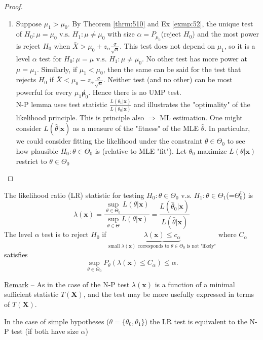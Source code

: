 \documentclass[english, 11pt]{article}
\begin{document}
\begin{proof}
\begin{enumerate}
\item Suppose $\mu_1>\mu_0$. By Theorem \ref{thrm:510} and Ex \ref{exmp:52}, the unique test of $H_0:\mu=\mu_0\text{ v.s. }H_1:\mu\not=\mu_0$ with size $\alpha=P_{\mu_0}$(reject $H_0$) and the most power is reject $H_0$ when $\bar{X}>\mu_0+z_\alpha\frac{\sigma}{\sqrt{n}}$. This test does not depend on $\mu_1$, so it is a level $\alpha$ test for $H_0:\mu=\mu\text{ v.s. }H_1:\mu\not=\mu_0$. No other test has more power at $\mu=\mu_1$. Similarly, if $\mu_1<\mu_0$, then the same can be said for the test that rejects $H_0$ if $\bar{X}<\mu_0-z_\alpha\frac{\sigma}{\sqrt{n}}$. Neither test (and no other) can be most powerful for every $\mu_1\not\mu_0$. Hence there is no UMP test.\\
N-P lemma uses test statistic $\frac{L(\theta_1|\bm{x})}{L(\theta_0|\bm{x})}$ and illustrates the "optimality" of the likelihood principle. This is principle also $\Rightarrow$ ML estimation. One might consider $L(\hat{\theta}|\bm{x})$ as a measure of the "fitness" of the MLE $\hat{\theta}$. In particular, we could consider fitting the likelihood under the constraint $\theta\in\Theta_0$ to see how plausible $ H_0:\theta\in\Theta_0$ is (relative to MLE "fit"). Let $\theta_0$ maximize $L(\theta|\bm{x})$ restrict to $\theta\in\Theta_0$ 
\end{enumerate}
\end{proof}


\begin{defn}\label{defn:519}
The likelihood ratio (LR) statistic for testing $H_0:\theta\in\Theta_0\text{ v.s. }H_1:\theta\in\Theta_1$(=$\Theta_0^\complement$) is 
$$
\lambda(\bm{x})=\frac{\sup_{\theta\in\Theta_0}L(\theta|\bm{x})}{\sup_{\theta\in\Theta}L(\theta|\bm{x})}=\frac{L(\hat{\theta}_0|\bm{x})}{L(\hat{\theta}|\bm{x})}
$$
The level $\alpha$ test is to reject $H_0$ if $\underbrace{\lambda(\bm{x})\leqslant c_\alpha}_{\text{small $\lambda(\bm{x})$ corresponds to $\theta\in\Theta_0$ is not "likely"}}$ where $C_\alpha$ satisfies
$$
\sup_{\theta\in\Theta_0}P_{\theta}(\lambda(\bm{x})\leqslant C_\alpha)\leqslant\alpha.
$$
\end{defn}

\underline{Remark} -- As  in the case of the N-P test $\lambda(\bm{x})$ is a function of a minimal sufficient statistic $T(\bm{X})$, and the test may be more usefully expressed in terms of $T(\bm{X})$.

\begin{thrm}\label{thrm:520}
In the case of simple hypotheses ($\theta=\{\theta_0, \theta_1\}$) the LR test is equivalent to the N-P test (if both have size $\alpha$)
\end{thrm}
\end{document}
